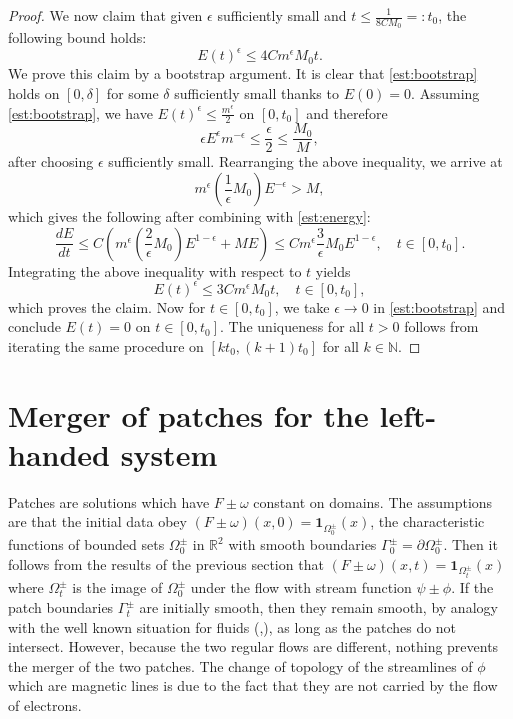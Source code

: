 \documentclass[11pt,reqno]{amsproc}
\newcommand{\pa}{\partial}
\newcommand{\la}{\label}
\newcommand{\Rr}{{\mathbb R}}
\begin{document}
\begin{proof}
We now claim that given $\epsilon$ sufficiently small and $t \le \frac{1}{8CM_0} =: t_0$, the following bound holds:
\begin{equation}
    \label{est:bootstrap}
    E(t)^\epsilon \le 4Cm^\epsilon M_0t.
\end{equation}
We prove this claim by a bootstrap argument. It is clear that \eqref{est:bootstrap} holds on $[0,\delta]$ for some $\delta$ sufficiently small thanks to $E(0) = 0$. Assuming \eqref{est:bootstrap}, we have $E(t)^\epsilon \le \frac{m^\epsilon}{2}$ on $[0,t_0]$ and therefore
$$
\epsilon E^\epsilon m^{-\epsilon} \le \frac\epsilon2 \le \frac{M_0}{M},
$$
after choosing $\epsilon$ sufficiently small. Rearranging the above inequality, we arrive at
$$
m^\epsilon \left(\frac{1}{\epsilon}M_0\right) E^{-\epsilon} > M,
$$
which gives the following after combining with \eqref{est:energy}:
$$
\frac{dE}{dt} \le C\left(m^\epsilon \left(\frac{2}{\epsilon}M_0\right) E^{1-\epsilon} + M E\right) \le Cm^\epsilon \frac3\epsilon M_0 E^{1-\epsilon},\quad t \in [0,t_0].
$$
Integrating the above inequality with respect to $t$ yields
$$
E(t)^\epsilon \le 3Cm^\epsilon M_0 t,\quad t \in [0,t_0],
$$
which proves the claim. Now for $t \in [0,t_0]$, we take $\epsilon \to 0$ in \eqref{est:bootstrap} and conclude $E(t) = 0$ on $t \in [0,t_0]$. The uniqueness for all $t > 0$ follows from iterating the same procedure on $[kt_0, (k+1)t_0]$ for all $k \in \mathbb{N}$.

\end{proof}
 
\section{Merger of patches for the left-handed system} \la{patchmerge}
Patches are solutions which have $F\pm\omega$ constant on domains. The assumptions are that the initial data obey $(F\pm\omega)(x,0) = \mathbf 1_{\Omega_0^{\pm}}(x)$, the characteristic functions of bounded sets $\Omega_0^{\pm}$ in $\Rr^2$ with smooth boundaries $\Gamma_0^{\pm} = \pa\Omega_0^{\pm}$. Then it follows from the results of the previous section that $(F\pm\omega)(x,t) = \mathbf 1_{\Omega_t^{\pm}}(x)$ where $\Omega_t^{\pm}$ is the image of $\Omega_0^{\pm}$ under the flow with stream function $\psi \pm \phi$. 
 If the patch boundaries $\Gamma_t^{\pm}$ are initially smooth, then they remain smooth, by analogy with the well known situation for fluids (\cite{bc},\cite{chemin}), as long as the patches do not intersect. However, because the two regular flows are different, nothing prevents the merger of the two patches.  The change of topology of the streamlines of $\phi$ which are magnetic lines is due to the fact that they are not carried by the flow of electrons.
\end{document}

